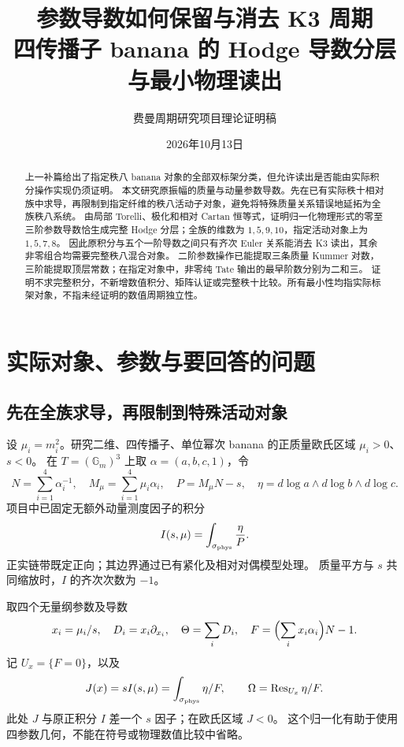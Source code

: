 \documentclass[11pt,a4paper]{ctexart}
\title{参数导数如何保留与消去 K3 周期\\[5pt]
\large 四传播子 banana 的 Hodge 导数分层与最小物理读出}
\author{费曼周期研究项目\quad 理论证明稿}
\date{2026年10月13日}
\theoremstyle{cnplain}
\theoremstyle{definition}
\theoremstyle{remark}
\newcommand{\Res}{\operatorname{Res}}
\begin{document}
\maketitle
\begin{abstract}
上一补篇给出了指定秩八 banana 对象的全部双标架分类，但允许读出是否能由实际积分操作实现仍须证明。
本文研究原振幅的质量与动量参数导数。先在已有实际秩十相对族中求导，再限制到指定纤维的秩八活动子对象，避免将特殊质量关系错误地延拓为全族秩八系统。
由局部 Torelli、极化和相对 Cartan 恒等式，证明归一化物理形式的零至三阶参数导数恰生成完整 Hodge 分层；全族的维数为 $1,5,9,10$，指定活动对象上为 $1,5,7,8$。
因此原积分与五个一阶导数之间只有齐次 Euler 关系能消去 K3 读出，其余非零组合均需要完整秩八混合对象。
二阶参数操作已能提取三条质量 Kummer 对数，三阶能提取顶层常数；在指定对象中，非零纯 Tate 输出的最早阶数分别为二和三。
证明不求完整积分，不新增数值积分、矩阵认证或完整秩十比较。所有最小性均指实际标架对象，不指未经证明的数值周期独立性。
\end{abstract}
\tableofcontents

\section{实际对象、参数与要回答的问题}
\subsection{先在全族求导，再限制到特殊活动对象}
设 $\mu_i=m_i^2$。研究二维、四传播子、单位幂次 banana 的正质量欧氏区域 $\mu_i>0$、$s<0$。
在 $T=(\mathbb G_m)^3$ 上取 $\alpha=(a,b,c,1)$，令
\begin{equation}\label{eq:raw}
 N=\sum_{i=1}^4\alpha_i^{-1},\quad M_\mu=\sum_{i=1}^4\mu_i\alpha_i,
 \quad P=M_\mu N-s,\quad
 \eta=d\log a\wedge d\log b\wedge d\log c.
\end{equation}
项目中已固定无额外动量测度因子的积分
\begin{equation}\label{eq:I}
 I(s,\mu)=\int_{\sigma_{\rm phys}}\frac{\eta}{P}.
\end{equation}
正实链带既定正向；其边界通过已有紧化及相对对偶模型处理。
质量平方与 $s$ 共同缩放时，$I$ 的齐次次数为 $-1$。

取四个无量纲参数及导数
\begin{equation}\label{eq:dimensionless}
 x_i=\mu_i/s,\quad D_i=x_i\partial_{x_i},\quad
 \Theta=\sum_iD_i,\quad
 F=\Bigl(\sum_i x_i\alpha_i\Bigr)N-1.
\end{equation}
记 $U_x=\{F=0\}$，以及
\begin{equation}\label{eq:J}
 J(x)=sI(s,\mu)=\int_{\sigma_{\rm phys}}\eta/F,\qquad
 \Omega=\Res_{U_x}\eta/F.
\end{equation}
此处 $J$ 与原正积分 $I$ 差一个 $s$ 因子；在欧氏区域 $J<0$。
这个归一化有助于使用四参数几何，不能在符号或物理数值比较中省略。
\end{document}
